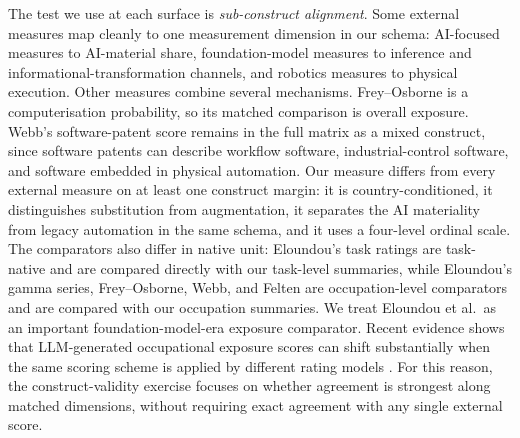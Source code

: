 \documentclass[11pt]{article}
\begin{document}
The test we use at each surface is \emph{sub-construct alignment}. Some external measures map cleanly to one measurement dimension in our schema: AI-focused measures to AI-material share, foundation-model measures to inference and informational-transformation channels, and robotics measures to physical execution. Other measures combine several mechanisms. Frey--Osborne is a computerisation probability, so its matched comparison is overall exposure. Webb's software-patent score remains in the full matrix as a mixed construct, since software patents can describe workflow software, industrial-control software, and software embedded in physical automation. Our measure differs from every external measure on at least one construct margin: it is country-conditioned, it distinguishes substitution from augmentation, it separates the AI materiality from legacy automation in the same schema, and it uses a four-level ordinal scale. The comparators also differ in native unit: Eloundou's task ratings are task-native and are compared directly with our task-level summaries, while Eloundou's gamma series, Frey--Osborne, Webb, and Felten are occupation-level comparators and are compared with our occupation summaries. We treat Eloundou et al.\ as an important foundation-model-era exposure comparator. Recent evidence shows that LLM-generated occupational exposure scores can shift substantially when the same scoring scheme is applied by different rating models \citep{YinVuPersico2026LLMExposureStability}. For this reason, the construct-validity exercise focuses on whether agreement is strongest along matched dimensions, without requiring exact agreement with any single external score.
\end{document}
